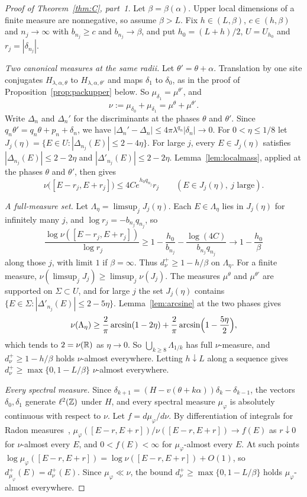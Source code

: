 \begin{proof}[Proof of Theorem~\ref{thm:C}, part~1]
Let $\beta=\beta(\alpha)$. Upper local dimensions of a finite measure are nonnegative, so assume $\beta>L$. Fix $h\in(L,\beta)$, $c\in(h,\beta)$ and $n_j\to\infty$ with $b_{n_j}\ge c$ and $b_{n_j}\to\beta$, and put $h_0=(L+h)/2$, $U=U_{h_0}$ and $r_j=|\delta_{n_j}|$.

\emph{Two canonical measures at the same radii.} Let $\theta'=\theta+\alpha$. Translation by one site conjugates $H_{\lambda,\alpha,\theta}$ to $H_{\lambda,\alpha,\theta'}$ and maps $\delta_1$ to $\delta_0$, as in the proof of Proposition~\ref{prop:packupper} below. So $\mu_{\delta_1}=\mu^{\theta'}$, and
\[
\nu:=\mu_{\delta_0}+\mu_{\delta_1}=\mu^\theta+\mu^{\theta'} .
\]
Write $\Delta_n$ and $\Delta_n'$ for the discriminants at the phases $\theta$ and $\theta'$. Since $q_n\theta'=q_n\theta+p_n+\delta_n$, we have $|\Delta_n'-\Delta_n|\le4\pi\lambda^{q_n}|\delta_n|\to0$. For $0<\eta\le1/8$ let $J_j(\eta)=\{E\in U:|\Delta_{n_j}(E)|\le2-4\eta\}$. For large $j$, every $E\in J_j(\eta)$ satisfies $|\Delta_{n_j}(E)|\le2-2\eta$ and $|\Delta'_{n_j}(E)|\le2-2\eta$. Lemma~\ref{lem:localmass}, applied at the phases $\theta$ and $\theta'$, then gives
\[
\nu\bigl([E-r_j,E+r_j]\bigr)\le4Ce^{h_0q_{n_j}}r_j\qquad(E\in J_j(\eta),\ j\text{ large}).
\]

\emph{A full-measure set.} Let $\Lambda_\eta=\limsup_jJ_j(\eta)$. Each $E\in\Lambda_\eta$ lies in $J_j(\eta)$ for infinitely many $j$, and $\log r_j=-b_{n_j}q_{n_j}$, so
\[
\frac{\log\nu([E-r_j,E+r_j])}{\log r_j}\ge1-\frac{h_0}{b_{n_j}}-\frac{\log(4C)}{b_{n_j}q_{n_j}}\to1-\frac{h_0}\beta
\]
along those $j$, with limit $1$ if $\beta=\infty$. Thus $d^+_\nu\ge1-h/\beta$ on $\Lambda_\eta$. For a finite measure, $\nu(\limsup_jJ_j)\ge\limsup_j\nu(J_j)$. The measures $\mu^\theta$ and $\mu^{\theta'}$ are supported on $\Sigma\subset U$, and for large $j$ the set $J_j(\eta)$ contains $\{E\in\Sigma:|\Delta'_{n_j}(E)|\le2-5\eta\}$. Lemma~\ref{lem:arcsine} at the two phases gives
\[
\nu(\Lambda_\eta)\ge\frac2\pi\arcsin(1-2\eta)+\frac2\pi\arcsin\Bigl(1-\frac{5\eta}2\Bigr),
\]
which tends to $2=\nu(\mathbb R)$ as $\eta\to0$. So $\bigcup_{k\ge8}\Lambda_{1/k}$ has full $\nu$-measure, and $d^+_\nu\ge1-h/\beta$ holds $\nu$-almost everywhere. Letting $h\downarrow L$ along a sequence gives $d^+_\nu\ge\max\{0,1-L/\beta\}$ $\nu$-almost everywhere.

\emph{Every spectral measure.} Since $\delta_{k+1}=(H-v(\theta+k\alpha))\delta_k-\delta_{k-1}$, the vectors $\delta_0,\delta_1$ generate $\ell^2(\mathbb Z)$ under $H$, and every spectral measure $\mu_\varphi$ is absolutely continuous with respect to $\nu$. Let $f=d\mu_\varphi/d\nu$. By differentiation of integrals for Radon measures~\cite[Theorem~2.12 and Corollary~2.14(2)]{Mattila1995}, $\mu_\varphi([E-r,E+r])/\nu([E-r,E+r])\to f(E)$ as $r\downarrow0$ for $\nu$-almost every $E$, and $0<f(E)<\infty$ for $\mu_\varphi$-almost every $E$. At such points $\log\mu_\varphi([E-r,E+r])=\log\nu([E-r,E+r])+O(1)$, so $d^+_{\mu_\varphi}(E)=d^+_\nu(E)$. Since $\mu_\varphi\ll\nu$, the bound $d^+_\nu\ge\max\{0,1-L/\beta\}$ holds $\mu_\varphi$-almost everywhere.
\end{proof}

